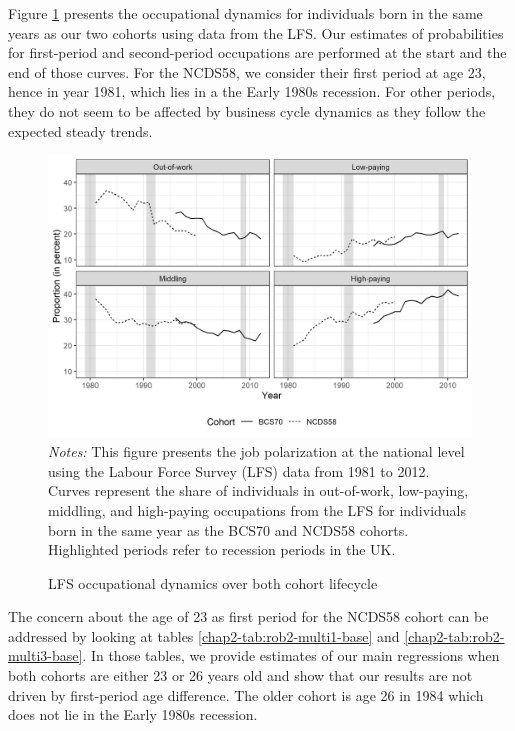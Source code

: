 Figure \ref{chap2-fig:lfs-national-cycle} presents the occupational dynamics for individuals born in the same years as our two cohorts using data from the LFS. Our estimates of probabilities for first-period and second-period occupations are performed at the start and the end of those curves. For the NCDS58, we consider their first period at age 23, hence in year 1981, which lies in a the Early 1980s recession. For other periods, they do not seem to be affected by business cycle dynamics as they follow the expected steady trends.
\begin{figure}[!htb]
    \centering
    \caption{LFS occupational dynamics over both cohort lifecycle}
    \label{chap2-fig:lfs-national-cycle}
    \includegraphics[width=\linewidth]{chap2/graphic/lfs-national-cycle.png}
    \vspace{-3em}
	\justify\singlespacing\footnotesize{\textit{Notes:} This figure presents the job polarization at the national level using the Labour Force Survey (LFS) data from 1981 to 2012. Curves represent the share of individuals in out-of-work, low-paying, middling, and high-paying occupations from the LFS for individuals born in the same year as the BCS70 and NCDS58 cohorts. Highlighted periods refer to recession periods in the UK.}
\end{figure}
The concern about the age of 23 as first period for the NCDS58 cohort can be addressed by looking at tables \ref{chap2-tab:rob2-multi1-base} and \ref{chap2-tab:rob2-multi3-base}. In those tables, we provide estimates of our main regressions when both cohorts are either 23 or 26 years old and show that our results are not driven by first-period age difference. The older cohort is age 26 in 1984 which does not lie in the Early 1980s recession.